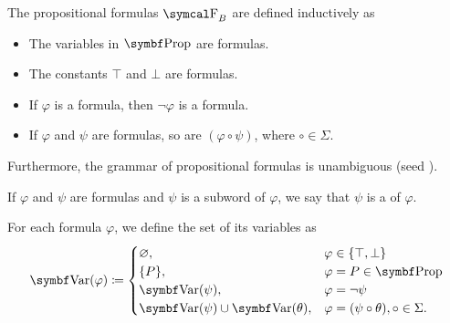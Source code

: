 \begin{Definition}\label{def:propositional_formulas}
  The propositional formulas \( \CF_B \) are defined inductively as
  \begin{itemize}
    \item The variables in \( \Bold{Prop} \) are formulas.
    \item The constants \( \top \) and \( \bot \) are formulas.
    \item If \( \varphi \) is a formula, then \( \neg \varphi \) is a formula.
    \item If \( \varphi \) and \( \psi \) are formulas, so are \( (\varphi \circ \psi) \), where \( \circ \in \Sigma \).
  \end{itemize}

  Furthermore, the grammar of propositional formulas is unambiguous (seed ).

  If \( \varphi \) and \( \psi \) are formulas and \( \psi \) is a subword of \( \varphi \), we say that \( \psi \) is a  of \( \varphi \).

  For each formula \( \varphi \), we define the set of its variables as
  \begin{align*}
    \Bold{Var}(\varphi) \coloneqq \begin{cases}
      \varnothing,                              &\varphi \in \{ \top, \bot \} \\
      \{ P \},                                  &\varphi = P \in \Bold{Prop} \\
      \Bold{Var}(\psi),                         &\varphi = \neg \psi \\
      \Bold{Var}(\psi) \cup \Bold{Var}(\theta), &\varphi = (\psi \circ \theta), \circ \in \Sigma.
    \end{cases}
  \end{align*}
\end{Definition}

